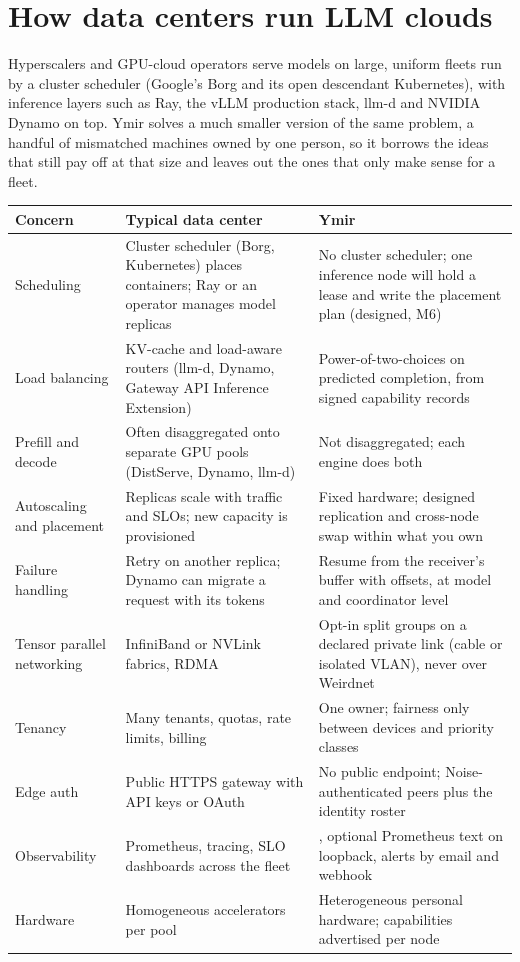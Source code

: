 \section{How data centers run LLM clouds}\label{sec:datacenter}

Hyperscalers and GPU-cloud operators serve models on large, uniform fleets run by a cluster
scheduler (Google's Borg and its open descendant Kubernetes), with inference layers such as Ray,
the vLLM production stack, llm-d and NVIDIA Dynamo on top. Ymir solves a much smaller version of
the same problem, a handful of mismatched machines owned by one person, so it borrows the ideas
that still pay off at that size and leaves out the ones that only make sense for a fleet.

{\small
\begin{xltabular}{\linewidth}{@{}L{2.7cm}YY@{}}
\toprule
Concern & Typical data center & Ymir \\
\midrule
\endhead
Scheduling & Cluster scheduler (Borg, Kubernetes) places containers; Ray or an operator manages model replicas & No cluster scheduler; one inference node will hold a lease and write the placement plan (designed, M6) \\
Load balancing & KV-cache and load-aware routers (llm-d, Dynamo, Gateway API Inference Extension) & Power-of-two-choices on predicted completion, from signed capability records \\
Prefill and decode & Often disaggregated onto separate GPU pools (DistServe, Dynamo, llm-d) & Not disaggregated; each engine does both \\
Autoscaling and placement & Replicas scale with traffic and SLOs; new capacity is provisioned & Fixed hardware; designed replication and cross-node swap within what you own \\
Failure handling & Retry on another replica; Dynamo can migrate a request with its tokens & Resume from the receiver's buffer with offsets, at model and coordinator level \\
Tensor parallel networking & InfiniBand or NVLink fabrics, RDMA & Opt-in split groups on a declared private link (cable or isolated VLAN), never over Weirdnet \\
Tenancy & Many tenants, quotas, rate limits, billing & One owner; fairness only between devices and priority classes \\
Edge auth & Public HTTPS gateway with API keys or OAuth & No public endpoint; Noise-authenticated peers plus the identity roster \\
Observability & Prometheus, tracing, SLO dashboards across the fleet & , optional Prometheus text on loopback, alerts by email and webhook \\
Hardware & Homogeneous accelerators per pool & Heterogeneous personal hardware; capabilities advertised per node \\
\bottomrule
\end{xltabular}
}

